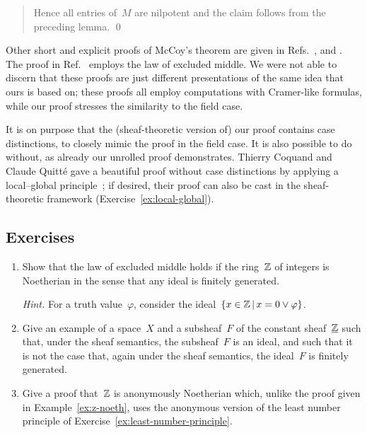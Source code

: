 \documentclass{ws-rv9x6}
\begin{document}
{\begin{quote}
Hence all entries of~$M$ are nilpotent and the claim follows from the preceding
lemma. \qed
\end{quote}

Other short and explicit proofs of McCoy's theorem are given in
Refs.~,
\cite[Theorem~5.22]{lombardi-quitte:constructive-algebra} and
\cite[Exercise~5.23A(3)]{lam:exercises}. The proof in
Ref.~\cite[Proposition~III.8.2.3]{bourbaki:alg} employs the law of excluded
middle. We were not able to discern that these proofs are just different
presentations of the same idea that ours is based on; these proofs all employ
computations with Cramer-like formulas, while our proof stresses the similarity
to the field case.

It is on purpose that the (sheaf-theoretic version of) our proof contains case
distinctions, to closely mimic the proof in the field case. It is also
possible to do without, as already our unrolled proof demonstrates. Thierry
Coquand and Claude Quitté gave a beautiful proof without case distinctions by
applying a local--global
principle~\cite[Theorem~2.4]{coquand-quitte:constructive-finite-free-resolutions};
if desired, their proof can also be cast in the sheaf-theoretic framework
(Exercise~\ref{ex:local-global}).


\subsection*{Exercises}

\begin{exercise}%
\begin{enumerate}
\item Show that the law of excluded middle holds if the ring~$\mathbb{Z}$ of integers
is Noetherian in the sense that any ideal is finitely generated.\smallskip

{\scriptsize\emph{Hint.} For a truth value~$\varphi$, consider the ideal~$\{ x
\in \mathbb{Z} \,|\, x = 0 \vee \varphi \}$.\par}
\item Give an example of a space~$X$ and a subsheaf~$F$ of the constant
sheaf~$\underline{\mathbb{Z}}$ such that, under the sheaf semantics, the subsheaf~$F$
is an ideal, and such that it is not the case that, again under the sheaf
semantics, the ideal~$F$ is finitely generated.
\item Give a proof that~$\mathbb{Z}$ is anonymously Noetherian which, unlike the proof
given in Example~\ref{ex:z-noeth}, uses the anonymous version of the least
number principle of Exercise~\ref{ex:least-number-principle}.
\end{enumerate}
\end{exercise}

}
\end{document}
